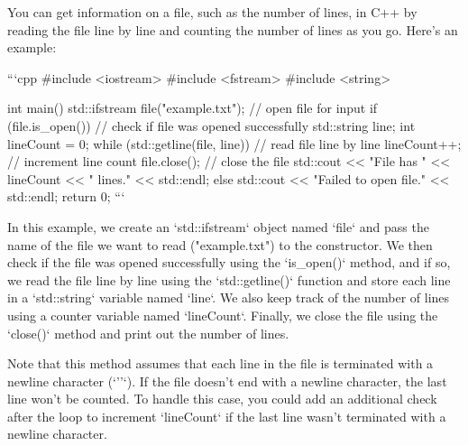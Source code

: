 You can get information on a file, such as the number of lines, in C++ by reading the file line by line and counting the number of lines as you go. Here's an example:

```cpp
#include <iostream>
#include <fstream>
#include <string>

int main() {
    std::ifstream file("example.txt"); // open file for input
    if (file.is_open()) { // check if file was opened successfully
        std::string line;
        int lineCount = 0;
        while (std::getline(file, line)) { // read file line by line
            lineCount++; // increment line count
        }
        file.close(); // close the file
        std::cout << "File has " << lineCount << " lines." << std::endl;
    }
    else {
        std::cout << "Failed to open file." << std::endl;
    }
    return 0;
}
```

In this example, we create an `std::ifstream` object named `file` and pass the name of the file we want to read ("example.txt") to the constructor. We then check if the file was opened successfully using the `is_open()` method, and if so, we read the file line by line using the `std::getline()` function and store each line in a `std::string` variable named `line`. We also keep track of the number of lines using a counter variable named `lineCount`. Finally, we close the file using the `close()` method and print out the number of lines.

Note that this method assumes that each line in the file is terminated with a newline character (`'\n'`). If the file doesn't end with a newline character, the last line won't be counted. To handle this case, you could add an additional check after the loop to increment `lineCount` if the last line wasn't terminated with a newline character.
